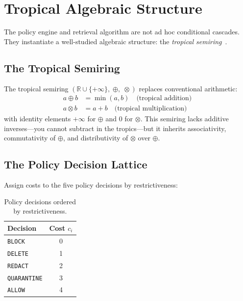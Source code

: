 \documentclass[11pt,twocolumn]{article}
\begin{document}
\section{Tropical Algebraic Structure}
\label{sec:tropical}

The policy engine and retrieval algorithm are not ad hoc conditional cascades. They instantiate a well-studied algebraic structure: the \emph{tropical semiring}~\cite{maclagan2015}.

\subsection{The Tropical Semiring}

The tropical semiring $(\mathbb{R} \cup \{+\infty\},\; \oplus,\; \otimes)$ replaces conventional arithmetic:
\begin{align}
a \oplus b &= \min(a, b) \quad \text{(tropical addition)} \\
a \otimes b &= a + b \quad \text{(tropical multiplication)}
\end{align}
with identity elements $+\infty$ for $\oplus$ and $0$ for $\otimes$. This semiring lacks additive inverses---you cannot subtract in the tropics---but it inherits associativity, commutativity of $\oplus$, and distributivity of $\otimes$ over $\oplus$.

\subsection{The Policy Decision Lattice}

Assign costs to the five policy decisions by restrictiveness:

\begin{table}[H]
\centering
\small
\begin{tabular}{@{}lc@{}}
\toprule
\textbf{Decision} & \textbf{Cost $c_i$} \\
\midrule
\texttt{BLOCK}      & 0 \\
\texttt{DELETE}      & 1 \\
\texttt{REDACT}      & 2 \\
\texttt{QUARANTINE}  & 3 \\
\texttt{ALLOW}       & 4 \\
\bottomrule
\end{tabular}
\caption{Policy decisions ordered by restrictiveness.}
\label{tab:tropical-costs}
\end{table}
\end{document}
